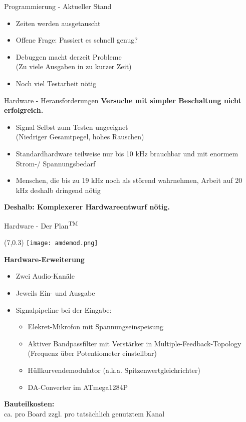 \documentclass[fleqn,11pt]{beamer}
\begin{document}
\begin{frame}{Programmierung - Aktueller Stand}
	\begin{itemize}
		\item Zeiten werden ausgetauscht
		\item Offene Frage: Passiert es schnell genug?
		\item Debuggen macht derzeit Probleme \\(Zu viele Ausgaben in zu kurzer Zeit)
		\item Noch viel Testarbeit nötig
	\end{itemize}
\end{frame}

\begin{frame}{Hardware - Herausforderungen}
	\textbf{Versuche mit simpler Beschaltung nicht erfolgreich.}
	\begin{itemize}
		\item Signal Selbst zum Testen ungeeignet\\(Niedriger Gesamtpegel, hohes Rauschen)
		\item Standardhardware teilweise nur bis 10 kHz brauchbar und mit enormem Strom-/ Spannungsbedarf
		\item Menschen, die bis zu 19 kHz noch als störend wahrnehmen, Arbeit auf 20 kHz deshalb dringend nötig
	\end{itemize}
	
	\textbf{Deshalb: Komplexerer Hardwareentwurf nötig.}
\end{frame}

\begin{frame}{Hardware - Der Plan\textsuperscript{\small{TM}}}
\begin{textblock}{7}(7,0.3)
\texttt{[image: amdemod.png]}
\end{textblock}
\vspace*{1.2cm}
	\textbf{Hardware-Erweiterung}
	\begin{itemize}
		\item Zwei Audio-Kanäle
		\item Jeweils Ein- und Ausgabe
		\item Signalpipeline  bei der Eingabe:
		\begin{itemize}
			\item Elekret-Mikrofon mit Spannungseinspeisung
			\item Aktiver Bandpassfilter mit Verstärker in Multiple-Feedback-Topology \\(Frequenz über Potentiometer einstellbar) 
			\item Hüllkurvendemodulator (a.k.a. Spitzenwertgleichrichter)
			\item DA-Converter im ATmega1284P
		\end{itemize}
	\end{itemize}
	\textbf{Bauteilkosten:}\\ ca.  pro Board zzgl.  pro tatsächlich genutztem Kanal
\end{frame}
\end{document}
